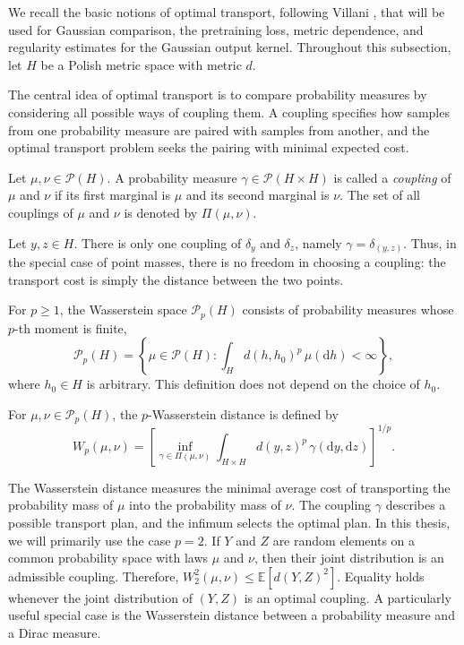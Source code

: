 We recall the basic notions of optimal transport, following Villani \cite{Villani2009}, that will be used for Gaussian comparison, the pretraining loss, metric dependence, and regularity estimates for the Gaussian output kernel. Throughout this subsection, let \(H\) be a Polish metric space with metric \(d\).

The central idea of optimal transport is to compare probability measures by considering all possible ways of coupling them. A coupling specifies how samples from one probability measure are paired with samples from another, and the optimal transport problem seeks the pairing with minimal expected cost.

\begin{definition}[Coupling]
Let \(\mu,\nu\in\mathcal P(H)\). A probability measure \(\gamma\in\mathcal P(H\times H)\) is called a \emph{coupling} of \(\mu\) and \(\nu\) if its first marginal is \(\mu\) and its second marginal is \(\nu\). The set of all couplings of \(\mu\) and \(\nu\) is denoted by \(\Pi(\mu,\nu)\).
\end{definition}

\begin{example}
Let \(y,z\in H\). There is only one coupling of \(\delta_y\) and \(\delta_z\), namely \(\gamma=\delta_{(y,z)}\). Thus, in the special case of point masses, there is no freedom in choosing a coupling: the transport cost is simply the distance between the two points.
\end{example}

\begin{definition}
For \(p\geqslant1\), the Wasserstein space \(\mathcal P_p(H)\) consists of probability measures whose \(p\)-th moment is finite,
\[
\mathcal P_p(H)=\left\{\mu\in\mathcal P(H):\int_H d(h,h_0)^p\,\mu(\mathrm dh)<\infty\right\},
\]
where \(h_0\in H\) is arbitrary. This definition does not depend on the choice of \(h_0\).
\end{definition}

\begin{definition}
For \(\mu,\nu\in\mathcal P_p(H)\), the \(p\)-Wasserstein distance is defined by
\[
W_p(\mu,\nu)=\left[\inf_{\gamma\in\Pi(\mu,\nu)}\int_{H\times H}d(y,z)^p\,\gamma(\mathrm dy,\mathrm dz)\right]^{1/p}.
\]
\end{definition}
The Wasserstein distance measures the minimal average cost of transporting the probability mass of \(\mu\) into the probability mass of \(\nu\). The coupling \(\gamma\) describes a possible transport plan, and the infimum selects the optimal plan. In this thesis, we will primarily use the case \(p=2\). If \(Y\) and \(Z\) are random elements on a common probability space with laws \(\mu\) and \(\nu\), then their joint distribution is an admissible coupling. Therefore, \(W_2^2(\mu,\nu)\leqslant\mathbb E[d(Y,Z)^2]\). Equality holds whenever the joint distribution of \((Y,Z)\) is an optimal coupling. A particularly useful special case is the Wasserstein distance between a probability measure and a Dirac measure.

